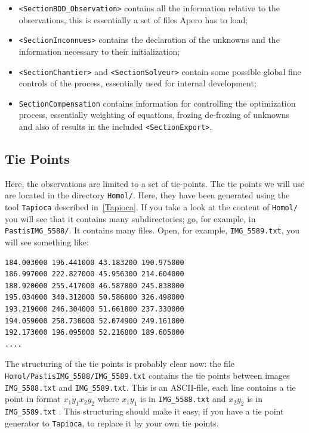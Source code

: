 \begin{itemize}
       \item {\tt <SectionBDD\_Observation>} contains all the information
             relative to the observations, this is essentially a set of files
             Apero has to load;

      \item  {\tt <SectionInconnues>} contains the declaration of the
             unknowns and the information necessary to their initialization;

      \item  {\tt <SectionChantier>} and {\tt <SectionSolveur>} contain some possible
             global fine controls of the process, essentially used for internal development;

       \item  {\tt SectionCompensation} contains information for controlling the
              optimization process, essentially weighting of equations, frozing de-frozing
              of unknowns and also  of results in the  included {\tt <SectionExport>}.
\end{itemize}

\subsection{Tie Points}

\label{Tie:Poi:Ex:Apero}

Here, the observations are limited to a set of tie-points. The tie points
we will use are located in the directory {\tt Homol/}. Here, they have been
generated using the tool {\tt Tapioca} described in~\ref{Tapioca}. If you
take a look at the content of {\tt Homol/} you will see that it contains
many subdirectories; go, for example, in {\tt PastisIMG\_5588/}.
It contains many files. Open, for example, {\tt IMG\_5589.txt},
you will see something like:

{\scriptsize
\begin{verbatim}
184.003000 196.441000 43.183200 190.975000
186.997000 222.827000 45.956300 214.604000
188.920000 255.417000 46.587800 245.838000
195.034000 340.312000 50.586800 326.498000
193.219000 246.304000 51.661800 237.330000
194.059000 258.730000 52.074900 249.161000
192.173000 196.095000 52.216800 189.605000
....
\end{verbatim}
}

The structuring of the tie points is probably clear now:
the file {\tt Homol/PastisIMG\_5588/IMG\_5589.txt} contains
the tie points between images {\tt IMG\_5588.txt} and {\tt IMG\_5589.txt}.
This is an ASCII-file, each line contains a tie point in format $x_1 y_1 x_2 y_2$
where $x_1 y_1$ is in {\tt  IMG\_5588.txt} and $x_2 y_2$ is in {\tt  IMG\_5589.txt} .
This structuring should make it easy, if you have a tie point
generator  to {\tt Tapioca}, to replace it by your own tie points.


